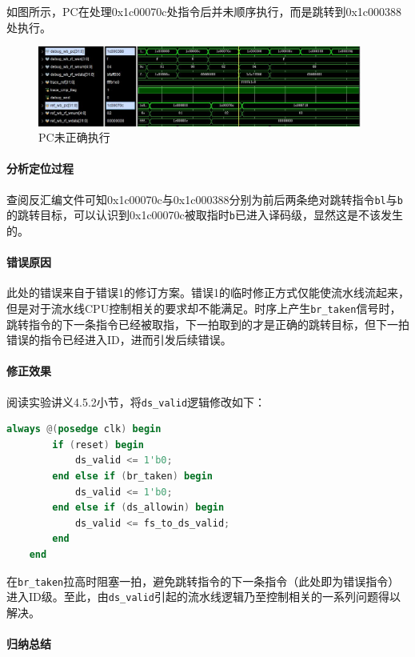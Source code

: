 \documentclass[UTF-8,twoside,c5size]{ctexart}
\begin{document}
	如图所示，PC在处理0x1c00070c处指令后并未顺序执行，而是跳转到0x1c000388处执行。
	
	\begin{figure}[!h]
		\centering
		\includegraphics*[width=0.95\textwidth]{03-dbg-05.jpg}
		\caption{PC未正确执行}
	\end{figure}

	\paragraph{分析定位过程}\hfill
	
	查阅反汇编文件可知{0x1c00070c}与{0x1c000388}分别为前后两条绝对跳转指令\texttt{bl}与\texttt{b}的跳转目标，可以认识到0x1c00070c被取指时\texttt{b}已进入译码级，显然这是不该发生的。
	
	\paragraph{错误原因}\hfill
	
	此处的错误来自于错误1的修订方案。错误1的临时修正方式仅能使流水线流起来，但是对于流水线CPU控制相关的要求却不能满足。时序上产生\texttt{br\_taken}信号时，跳转指令的下一条指令已经被取指，下一拍取到的才是正确的跳转目标，但下一拍错误的指令已经进入ID，进而引发后续错误。
	
	\paragraph{修正效果}\hfill
	
	阅读实验讲义4.5.2小节，将\texttt{ds\_valid}逻辑修改如下：
	\begin{lstlisting}[language=verilog]
	always @(posedge clk) begin
		if (reset) begin
			ds_valid <= 1'b0;
		end else if (br_taken) begin
			ds_valid <= 1'b0;
		end else if (ds_allowin) begin
			ds_valid <= fs_to_ds_valid;
		end
	end
	\end{lstlisting}

	在\texttt{br\_taken}拉高时阻塞一拍，避免跳转指令的下一条指令（此处即为错误指令）进入ID级。至此，由\texttt{ds\_valid}引起的流水线逻辑乃至控制相关的一系列问题得以解决。
	
	\paragraph{归纳总结}\hfill
	
\end{document}
